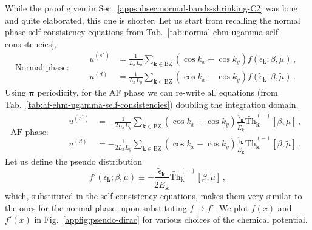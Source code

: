 \begin{tabproof}

While the proof given in Sec.~\ref{appsubsec:normal-bands-shrinking-C2} was long and quite elaborated, this one is shorter. Let us start from recalling the normal phase self-consistency equations from Tab.~\ref{tab:normal-ehm-ugamma-self-consistencies},
\[
\text{Normal phase:}
\qquad
\begin{aligned}
	u^{(s^*)} &= \frac{1}{L_x L_y} \sum_{\mathbf{k}\in\mathrm{BZ}} (\cos k_x + \cos k_y) f(\tilde{\epsilon}_\mathbf{k};\beta,\tilde{\mu}) \, , \\
	u^{(d)} &= \frac{1}{L_x L_y} \sum_{\mathbf{k}\in\mathrm{BZ}} (\cos k_x - \cos k_y) f(\tilde{\epsilon}_\mathbf{k};\beta,\tilde{\mu}) \, .
\end{aligned}
\]
Using $\bm{\pi}$ periodicity, for the AF phase we can re-write all equations (from Tab.~\ref{tab:af-ehm-ugamma-self-consistencies}) doubling the integration domain,
\[
\text{AF phase:}
\qquad
\begin{aligned}
	u^{(s^*)} &= -\frac{1}{2L_x L_y} \sum_{\mathbf{k}\in\mathrm{BZ}} (\cos k_x + \cos k_y) \frac{\tilde{\epsilon}_\mathbf{k}}{\tilde{E}_\mathbf{k}} \tilde{\mathrm{Th}}_\mathbf{k}^{(-)}[\beta,\tilde{\mu}] \, ,\\
	u^{(d)} &= -\frac{1}{2L_x L_y} \sum_{\mathbf{k}\in\mathrm{BZ}} (\cos k_x - \cos k_y) \frac{\tilde{\epsilon}_\mathbf{k}}{\tilde{E}_\mathbf{k}} \tilde{\mathrm{Th}}_\mathbf{k}^{(-)}[\beta,\tilde{\mu}] \, .
\end{aligned}
\]
Let us define the pseudo distribution
\[
	f'(\tilde{\epsilon}_\mathbf{k};\beta,\tilde{\mu}) \equiv - \frac{\tilde{\epsilon}_\mathbf{k}}{2\tilde{E}_\mathbf{k}} \tilde{\mathrm{Th}}_\mathbf{k}^{(-)}[\beta,\tilde{\mu}] \, ,
\]
which, substituted in the self-consistency equations, makes them very similar to the ones for the normal phase, upon substituting $f \to f'$. We plot $f(x)$ and $f'(x)$ in Fig.~\ref{appfig:pseudo-dirac} for various choices of the chemical potential.


\end{tabproof}
